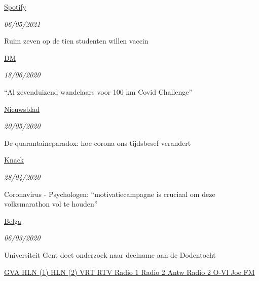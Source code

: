 \documentclass[
]{article}
\begin{document}
\href{https://open.spotify.com/episode/2GjCmZTxjONfmgYBNhPNJu?si=7d5da8bf43104ce5}{Spotify
}

\emph{06/05/2021}

Ruim zeven op de tien studenten willen vaccin

\href{download/press/covid/20210506Ruim-zeven-op-de-tien-studenten-willen-vaccin.pdf}{DM
}

\emph{18/06/2020}

``Al zevenduizend wandelaars voor 100 km Covid Challenge''

\href{download/press/covid/20200618zevenduizend-wandelaars-voor-100-km-Covid-Cha.pdf}{Nieuwsblad
}

\emph{20/05/2020}

De quarantaineparadox: hoe corona ons tijdsbesef verandert

\href{download/press/covid/20200520knack.pdf}{Knack }

\emph{28/04/2020}

Coronavirus - Psychologen: ``motivatiecampagne is cruciaal om deze
volksmarathon vol te houden''

\href{download/press/covid/20200428volksmarathon-vol-t.pdf}{Belga }

\emph{06/03/2020}

Universiteit Gent doet onderzoek naar deelname aan de Dodentocht

\href{download/press/dodentocht/download-clip_20200306_gazet-van-antwerpen-mechelen-waas_p-22-23.pdf}{GVA
}
\href{download/press/dodentocht/20200306_Het-Laatste-Nieuws_p-0_Dodentocht-Goesting-zorgt-voor-betere-motivatie-dan-druk.pdf}{HLN
(1) }
\href{download/press/dodentocht/download-clip_20200307_het-laatste-nieuws-mechelen-lier_p-40-41.pdf}{HLN
(2) } \href{download/press/dodentocht/vrt_be.pdf}{VRT }
\href{download/press/dodentocht/rtv_be.pdf}{RTV }
\href{download/press/dodentocht/Radio1_06032020.mp4}{Radio 1 }
\href{download/press/dodentocht/Radio2_Antwerpen_06032020.aac}{Radio 2
Antw } \href{download/press/dodentocht/Radio2_OVL_06032020.aac}{Radio 2
O-Vl } \href{download/press/dodentocht/JoeFM_06032020.aac}{Joe FM }
\end{document}
